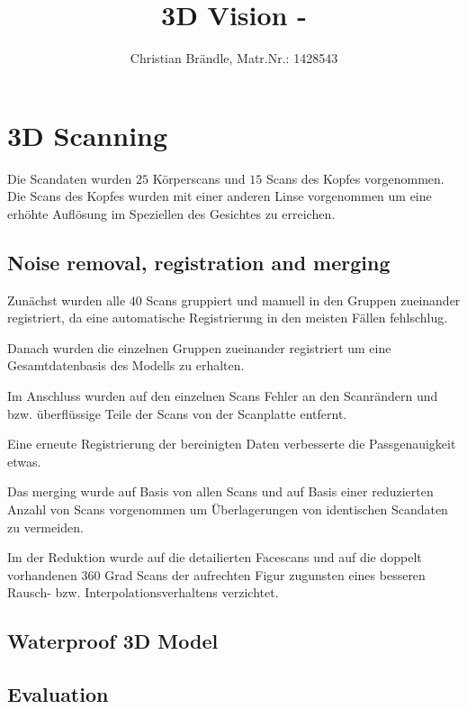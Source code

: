 \documentclass[]{article}
\title{3D Vision - }
\author{Christian Br\"andle, Matr.Nr.: 1428543}
\begin{document}
\maketitle


\section{3D Scanning}

Die Scandaten wurden $25$ Körperscans und $15$ Scans des Kopfes vorgenommen.
Die Scans des Kopfes wurden mit einer anderen Linse vorgenommen um eine erhöhte Auflösung im Speziellen des Gesichtes zu erreichen.

\subsection{Noise removal, registration and merging}

Zunächst wurden alle $40$ Scans gruppiert und manuell in den Gruppen zueinander registriert, da eine automatische Registrierung in den meisten Fällen fehlschlug.

Danach wurden die einzelnen Gruppen zueinander registriert um eine Gesamtdatenbasis des Modells zu erhalten.

Im Anschluss wurden auf den einzelnen Scans Fehler an den Scanrändern und bzw. überflüssige Teile der Scans von der Scanplatte entfernt.

Eine erneute Registrierung der bereinigten Daten verbesserte die Passgenauigkeit etwas. 

Das merging wurde auf Basis von allen Scans und auf Basis einer reduzierten Anzahl von Scans vorgenommen um Überlagerungen von identischen Scandaten zu vermeiden.

Im der Reduktion wurde auf die detailierten Facescans und auf die doppelt vorhandenen 360 Grad Scans der aufrechten Figur zugunsten eines besseren Rausch- bzw. Interpolationsverhaltens verzichtet.

\subsection{Waterproof 3D Model}

\subsection{Evaluation}
\end{document}
